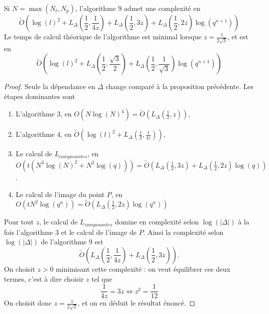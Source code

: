 \begin{Prop}
	Si $N = \max(N_t,N_{p})$, l'algorithme $9$ admet une complexité en 
	\begin{equation*}
		\tilde{O}\left( \log(l)^2 + L_\Delta\left(\frac{1}{2}, \frac{1}{4z}\right) + L_\Delta\left(\frac{1}{2}, 3z\right) + L_\Delta\left( \frac{1}{2}, 2z\right) \log\left( q^{n+1}\right)\right) 
	\end{equation*}
	 Le temps de calcul théorique de l'algorithme est minimal lorsque $z = \frac{1}{2\sqrt{3}}$, et est en 
	 \begin{equation*}
	 	\tilde{O}\left( \log(l)^2 + L_\Delta\left(\frac{1}{2}, \frac{\sqrt{3}}{2}\right) + L_\Delta\left( \frac{1}{2}, \frac{1}{\sqrt{3}}\right) \log\left( q^{n+1}\right)  \right)
	 \end{equation*}
\end{Prop}
	
\begin{proof}
	 Seule la dépendance en $\Delta$ change comparé à la proposition précédente. Les étapes dominantes sont
	 \begin{enumerate}
	 	\item L'algorithme $3$, en $O(N\log(N)^4) = \tilde{O}(L_\Delta(\frac{1}{2}, z))$,
	 	\item L'algorithme $4$, en $\tilde{O}(\log(l)^2 + L_\Delta(\frac{1}{2}, \frac{1}{4z}))$,
	 	\item Le calcul de $L_{composantes}$, en $O\left( t\left(N^3\log(N)^{2} + N^2\log(q) \right) \right) = \tilde{O}(L_\Delta(\frac{1}{2}, 3z) + L_\Delta(\frac{1}{2}, 2z)\log(q) )$.
	 	\item Le calcul de l'image du point $P$, en $O(tN^2\log(q^n)) = \tilde{O}(L_\Delta(\frac{1}{2}, 2z)\log(q^n))$
	 \end{enumerate}
	 Pour tout $z$, le calcul de $L_{composantes}$ domine en complexité selon $\log(|\Delta|)$ à la fois l'algorithme $3$ et le calcul de l'image de $P$. Ainsi la complexité selon $\log(|\Delta|)$ de l'algorithme $9$ est
	 \begin{equation*}
	 	\tilde{O}\left( L_\Delta\left(\frac{1}{2}, \frac{1}{4z} \right) + L_\Delta\left(\frac{1}{2}, 3z \right) \right). 
	 \end{equation*}
	 On choisit $z > 0$ minimisant cette complexité : on veut équilibrer ces deux termes, c'est à dire choisir $z$ tel que
	 \begin{equation*}
	 	\frac{1}{4z} = 3z \iff z^2 = \frac{1}{12}
	 \end{equation*}
	 On choisit donc $z = \frac{1}{2\sqrt{3}}$, et on en déduit le résultat énoncé. 
	 
\end{proof}